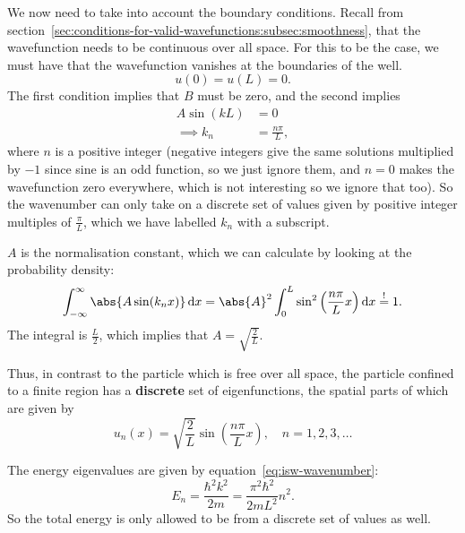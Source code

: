 \documentclass[../quantum_mechanics.tex]{subfiles}
\begin{document}
            We now need to take into account the boundary conditions.
            Recall from section~\ref{sec:conditions-for-valid-wavefunctions:subsec:smoothness}, that the wavefunction needs to be continuous over all space.
            For this to be the case, we must have that the wavefunction vanishes at the boundaries of the well.
            \begin{equation}
                u(0)=u(L)=0.
            \end{equation}
            The first condition implies that $B$ must be zero, and the second implies
            \begin{align}
                A\sin(kL)&=0\\
                \implies k_n&=\frac{n\pi}{L},
            \end{align}
            where $n$ is a positive integer (negative integers give the same solutions multiplied by $-1$ since sine is an odd function, so we just ignore them, and $n=0$ makes the wavefunction zero everywhere, which is not interesting so we ignore that too).
            So the wavenumber can only take on a discrete set of values given by positive integer multiples of $\frac{\pi}{L}$, which we have labelled $k_n$ with a subscript.

            $A$ is the normalisation constant, which we can calculate by looking at the probability density:
            \begin{equation}
                \int_{-\infty}^\infty\abs{A\sin(k_n x)}\dd{x}=\abs{A}^2\int_0^L\sin^2\left(\frac{n\pi}{L}x\right)\dd{x}\overset{!}{=}1.
            \end{equation}
            The integral is $\frac{L}{2}$, which implies that $A=\sqrt{\frac{2}{L}}$.

            Thus, in contrast to the particle which is free over all space, the particle confined to a finite region has a \textbf{discrete} set of eigenfunctions, the spatial parts of which are given by
            \begin{equation}\label{eq:isw-spatial-eigenstates}
                u_n(x)=\sqrt{\frac{2}{L}}\sin\left(\frac{n\pi}{L}x\right),\quad n=1,2,3,\dots
            \end{equation}

            The energy eigenvalues are given by equation~\ref{eq:isw-wavenumber}:
            \begin{equation}\label{eq:isw-eigenvalues}
                E_n=\frac{\hbar^2k^2}{2m}=\frac{\pi^2\hbar^2}{2mL^2}n^2.
            \end{equation}
            So the total energy is only allowed to be from a discrete set of values as well.
\end{document}
